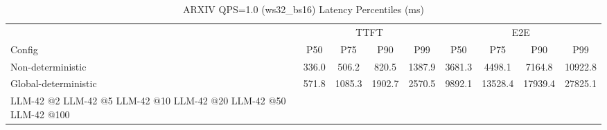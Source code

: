 \begin{table}[htbp]
\centering
\caption{ARXIV QPS=1.0 (ws32_bs16) Latency Percentiles (ms)}
\label{tab:arxiv_qps1.0_ws32_bs16}
\begin{tabular}{l|cccc|cccc}
\toprule
& \multicolumn{4}{c|}{TTFT} & \multicolumn{4}{c}{E2E} \\
Config & P50 & P75 & P90 & P99 & P50 & P75 & P90 & P99 \\
\midrule
Non-deterministic & 336.0 & 506.2 & 820.5 & 1387.9 & 3681.3 & 4498.1 & 7164.8 & 10922.8 \\
Global-deterministic & 571.8 & 1085.3 & 1902.7 & 2570.5 & 9892.1 & 13528.4 & 17939.4 & 27825.1 \\
LLM-42 @2%
LLM-42 @5%
LLM-42 @10%
LLM-42 @20%
LLM-42 @50%
LLM-42 @100%
\bottomrule
\end{tabular}
\end{table}
